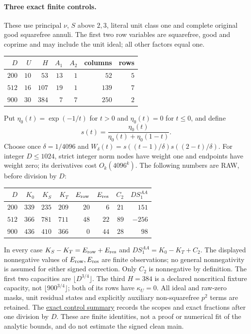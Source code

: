 \paragraph{Three exact finite controls.}
These use principal $\nu$, $S$ above $2,3$, literal unit class one and
complete original good squarefree annuli. The first two row variables are squarefree, good and coprime and may
include the unit ideal; all other factors equal one.
\begin{center}
\begin{tabular}{r|rrrrrr}
 $D$ & $U$ & $H$ & $A_1$ & $A_2$ & columns & rows\\\hline
 $200$ & $10$ & $53$ & $13$ & $1$ & $52$ & $5$\\
 $512$ & $16$ & $107$ & $19$ & $1$ & $139$ & $7$\\
 $900$ & $30$ & $384$ & $7$ & $7$ & $250$ & $2$\\
\end{tabular}
\end{center}
Put $\eta_0(t)=\exp(-1/t)$ for $t>0$ and $\eta_0(t)=0$ for $t\le0$,
and define
\[
 s(t)=\frac{\eta_0(t)}{\eta_0(t)+\eta_0(1-t)}.
\]
Choose once $\delta=1/4096$ and
$W_\delta(t)=s((t-1)/\delta)s((2-t)/\delta)$. For integer $D\le1024$, strict integer norm nodes have
weight one and endpoints have weight zero; its derivatives cost
$O_k(4096^k)$. The following numbers are RAW, before division by $D$:
\begin{center}
\begin{tabular}{r|rrrrrrr}
 $D$ & $K_0$ & $K_S$ & $K_T$ & $E_{\rm row}$ & $E_{\rm res}$ & $C_2$
        & $DS_1^{AA}$\\\hline
 $200$ & $339$ & $235$ & $209$ & $20$ & $6$ & $21$ & $151$\\
 $512$ & $366$ & $781$ & $711$ & $48$ & $22$ & $89$ & $-256$\\
 $900$ & $436$ & $410$ & $366$ & $0$ & $44$ & $28$ & $98$\\
\end{tabular}
\end{center}
In every case $K_S-K_T=E_{\rm row}+E_{\rm res}$ and
$DS_1^{AA}=K_0-K_T+C_2$. The displayed nonnegative values of
$E_{\rm row},E_{\rm res}$ are finite observations; no general
nonnegativity is assumed for either signed correction. Only $C_2$ is
nonnegative by definition. The first two capacities are
$\lfloor D^{3/4}\rfloor$. The third $H=384$ is a declared noncritical
fixture capacity, not $\lfloor900^{3/4}\rfloor$; both of its rows have
$\kappa_U=0$. All ideal and raw-zero masks, unit residual states and
explicitly auxiliary non-squarefree $p^2$ terms are retained. The
\href{https://amelie-iska.github.io/GRH-research/data/rough-mask-controls.json}{exact control summary}
records the scopes and exact fractions after one division by $D$.
These are finite identities, not a proof or numerical fit of the analytic
bounds, and do not estimate the signed clean main.
